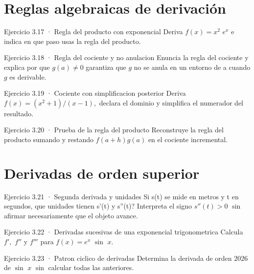 \documentclass[10pt,a4paper,oneside,openany]{book}
\begin{document}
\section{Reglas algebraicas de derivación}
\begin{PSevenExerciseFixed}{Ejercicio 3.17 · Regla del producto con exponencial}
Deriva \(f(x)=x^{2}\) \(e^x\) e indica en que paso usas la regla del producto.
\end{PSevenExerciseFixed}
\begin{PSevenExerciseFixed}{Ejercicio 3.18 · Regla del cociente y no anulacion}
Enuncia la regla del cociente y explica por que \(g(a)\ne 0\) garantiza que \(g\) no se anula en un entorno de a cuando \(g\) es derivable.
\end{PSevenExerciseFixed}
\begin{PSevenExerciseFixed}{Ejercicio 3.19 · Cociente con simplificacion posterior}
Deriva \(f(x)=(x^{2}+1)/(x-1),\) declara el dominio y simplifica el numerador del resultado.
\end{PSevenExerciseFixed}
\begin{PSevenExerciseFixed}{Ejercicio 3.20 · Prueba de la regla del producto}
Reconstruye la regla del producto sumando y restando \(f(a+h)g(a)\) en el cociente incremental.
\end{PSevenExerciseFixed}
\section{Derivadas de orden superior}
\begin{PSevenExerciseFixed}{Ejercicio 3.21 · Segunda derivada y unidades}
Si s(t) se mide en metros y t en segundos, que unidades tienen s'(t) y s''(t)? Interpreta el signo \(s''(t)>0\) \(\sin\) afirmar necesariamente que el objeto avance.
\end{PSevenExerciseFixed}
\begin{PSevenExerciseFixed}{Ejercicio 3.22 · Derivadas sucesivas de una exponencial trigonometrica}
Calcula \(f',\) \(f''\) y \(f'''\) para \(f(x)=e^x\) \(\sin\) \(x\).
\end{PSevenExerciseFixed}
\begin{PSevenExerciseFixed}{Ejercicio 3.23 · Patron ciclico de derivadas}
Determina la derivada de orden \(2026\) de \(\sin\) \(x\) \(\sin\) calcular todas las anteriores.
\end{PSevenExerciseFixed}
\end{document}
